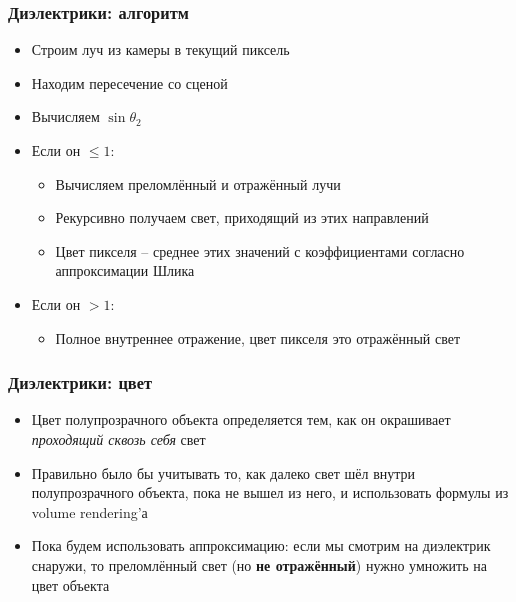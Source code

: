 \documentclass[10pt,handout]{beamer}
\begin{document}
\begin{frame}
\frametitle{Диэлектрики: алгоритм}
\begin{itemize}
\item Строим луч из камеры в текущий пиксель
\pause
\item Находим пересечение со сценой
\pause
\item Вычисляем \begin{math}\sin\theta_2\end{math}
\pause
\item Если он \begin{math}\leq 1\end{math}:
\pause
\begin{itemize}
\item Вычисляем преломлённый и отражённый лучи
\pause
\item Рекурсивно получаем свет, приходящий из этих направлений
\pause
\item Цвет пикселя -- среднее этих значений с коэффициентами согласно аппроксимации Шлика
\end{itemize}
\pause
\item Если он \begin{math}> 1\end{math}:
\pause
\begin{itemize}
\item Полное внутреннее отражение, цвет пикселя это отражённый свет
\end{itemize}
\end{itemize}
\end{frame}

\begin{frame}
\frametitle{Диэлектрики: цвет}
\begin{itemize}
\item Цвет полупрозрачного объекта определяется тем, как он окрашивает \textit{проходящий сквозь себя} свет
\pause
\item Правильно было бы учитывать то, как далеко свет шёл внутри полупрозрачного объекта, пока не вышел из него, и использовать формулы из volume rendering'а
\pause
\item Пока будем использовать аппроксимацию: если мы смотрим на диэлектрик снаружи, то преломлённый свет (но \textbf{не отражённый}) нужно умножить на цвет объекта
\end{itemize}
\end{frame}
\end{document}
